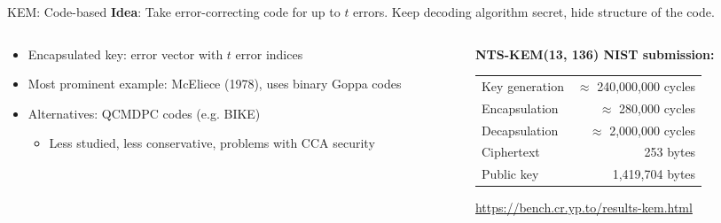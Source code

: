 \documentclass[xcolor=table,10pt,aspectratio=169]{beamer}
\begin{document}
\begin{frame}[label={sec:org78fe8ab}]{KEM: Code-based}
\textbf{Idea}: Take error-correcting code for up to \(t\) errors. Keep decoding algorithm secret, hide structure of the code.

\begin{columns}[t]
\begin{column}{0.5\columnwidth}
\begin{itemize}
\item Encapsulated key: error vector with \(t\) error indices
\item Most prominent example: McEliece (1978), uses binary Goppa codes
\item Alternatives: QCMDPC codes (e.g. BIKE)
\begin{itemize}
\item Less studied, less conservative, problems with CCA security
\end{itemize}
\end{itemize}
\end{column}

\begin{column}{0.5\columnwidth}
\textbf{NTS-KEM(13, 136) NIST submission:}

\begin{center}
\begin{tabular}{lr}
Key generation & \(\approx\) 240,000,000 cycles\\
Encapsulation & \(\approx\) 280,000 cycles\\
Decapsulation & \(\approx\) 2,000,000 cycles\\
Ciphertext & 253 bytes\\
Public key & 1,419,704 bytes\\
\end{tabular}

\end{center}

\small \url{https://bench.cr.yp.to/results-kem.html}
\end{column}
\end{columns}
\end{frame}
\end{document}
